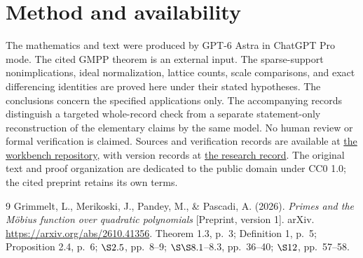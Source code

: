\documentclass[11pt]{article}
\newcommand{\workbenchurl}{https://github.com/KokunoYumeto/zeta-and-l-functions-workbench}
\newcommand{\recordurl}{https://github.com/KokunoYumeto/mathematics-workbenches}
\begin{document}
\section*{Method and availability}
The mathematics and text were produced by GPT-6 Astra in ChatGPT Pro mode.
The cited GMPP theorem is an external input. The sparse-support
nonimplications, ideal normalization, lattice counts, scale comparisons,
and exact differencing identities are proved here under their stated
hypotheses. The conclusions concern the specified applications only.
The accompanying records distinguish a targeted whole-record check from
a separate statement-only reconstruction of the elementary claims by
the same model. No human review or formal verification is claimed.
Sources and verification records are available at
\href{\workbenchurl}{the workbench repository}, with version records at
\href{\recordurl}{the research record}.
The original text and proof organization are dedicated to the public
domain under CC0 1.0; the cited preprint retains its own terms.

\begin{thebibliography}{9}
Grimmelt, L., Merikoski, J., Pandey, M., \& Pascadi, A. (2026).
\emph{Primes and the Möbius function over quadratic polynomials}
[Preprint, version 1]. arXiv.
\url{https://arxiv.org/abs/2610.41356}.
Theorem 1.3, p.~3; Definition 1, p.~5; Proposition 2.4, p.~6;
\(\S2.5\), pp.~8--9; \(\S\S8.1\)--8.3, pp.~36--40;
\(\S12\), pp.~57--58.
\end{thebibliography}
\end{document}
